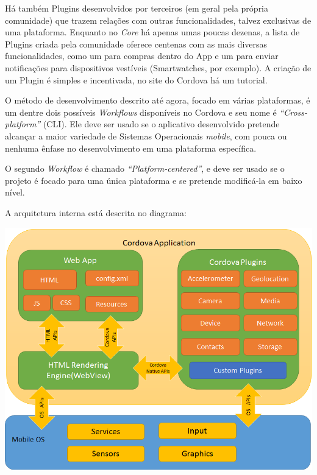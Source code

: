 \documentclass[a4paper,12pt]{article}
\begin{document}
Há também Plugins desenvolvidos por terceiros (em geral pela própria comunidade) que trazem relações com outras funcionalidades, talvez exclusivas de uma plataforma. Enquanto no \emph{Core} há apenas umas poucas dezenas, a lista de Plugins criada pela comunidade oferece centenas com as mais diversas funcionalidades, como um para compras dentro do App e um para enviar notificações para dispositivos vestíveis (Smartwatches, por exemplo). A criação de um Plugin é simples e incentivada, no site do Cordova há um tutorial.

O método de desenvolvimento descrito até agora, focado em várias plataformas, é um dentre dois possíveis \emph{Workflows} disponíveis no Cordova e seu nome é \emph{“Cross-platform”} (CLI). Ele deve ser usado se o aplicativo desenvolvido pretende alcançar a maior variedade de Sistemas Operacionais \emph{mobile}, com pouca ou nenhuma ênfase no desenvolvimento em uma plataforma específica.

O segundo \emph{Workflow} é chamado \emph{“Platform-centered”}, e deve ser usado se o projeto é focado para uma única plataforma e se pretende modificá-la em baixo nível.

A arquitetura interna está descrita no diagrama:

\includegraphics[width=1\linewidth]{images/cordovaapparchitecture.png}



\end{document}
